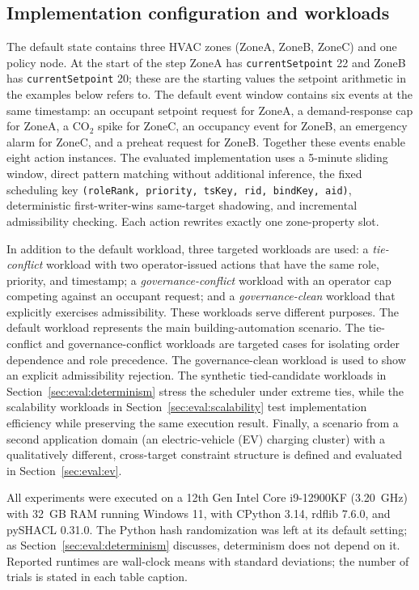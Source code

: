 \documentclass{ieeeaccess}
\theoremstyle{definition}
\theoremstyle{plain}
\theoremstyle{remark}
\begin{document}
\subsection{Implementation configuration and workloads}
\label{sec:eval:setup}

The default state contains three HVAC zones (ZoneA, ZoneB, ZoneC) and one policy node. At the start of the step ZoneA has \texttt{currentSetpoint} 22 and ZoneB has \texttt{currentSetpoint} 20; these are the starting values the setpoint arithmetic in the examples below refers to. The default event window contains six events at the same timestamp: an occupant setpoint request for ZoneA, a demand-response cap for ZoneA, a CO$_2$ spike for ZoneC, an occupancy event for ZoneB, an emergency alarm for ZoneC, and a preheat request for ZoneB. Together these events enable eight action instances. The evaluated implementation uses a 5-minute sliding window, direct pattern matching without additional inference, the fixed scheduling key \texttt{(roleRank, priority, tsKey, rid, bindKey, aid)}, deterministic first-writer-wins same-target shadowing, and incremental admissibility checking. Each action rewrites exactly one zone-property slot.

In addition to the default workload, three targeted workloads are used: a \emph{tie-conflict} workload with two operator-issued actions that have the same role, priority, and timestamp; a \emph{governance-conflict} workload with an operator cap competing against an occupant request; and a \emph{governance-clean} workload that explicitly exercises admissibility. These workloads serve different purposes. The default workload represents the main building-automation scenario. The tie-conflict and governance-conflict workloads are targeted cases for isolating order dependence and role precedence. The governance-clean workload is used to show an explicit admissibility rejection. The synthetic tied-candidate workloads in Section~\ref{sec:eval:determinism} stress the scheduler under extreme ties, while the scalability workloads in Section~\ref{sec:eval:scalability} test implementation efficiency while preserving the same execution result. Finally, a scenario from a second application domain (an electric-vehicle (EV) charging cluster) with a qualitatively different, cross-target constraint structure is defined and evaluated in Section~\ref{sec:eval:ev}.

All experiments were executed on a 12th Gen Intel Core i9-12900KF (3.20~GHz) with 32~GB RAM running Windows 11, with CPython 3.14, rdflib 7.6.0, and pySHACL 0.31.0. The Python hash randomization was left at its default setting; as Section~\ref{sec:eval:determinism} discusses, determinism does not depend on it. Reported runtimes are wall-clock means with standard deviations; the number of trials is stated in each table caption.
\end{document}
